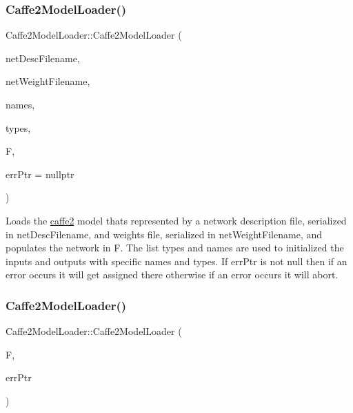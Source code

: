 \subsubsection{\texorpdfstring{Caffe2\+Model\+Loader()}{Caffe2ModelLoader()}\hspace{0.1cm}{\footnotesize\ttfamily [1/2]}}
{\footnotesize\ttfamily Caffe2\+Model\+Loader\+::\+Caffe2\+Model\+Loader (\begin{DoxyParamCaption}\item[{const std\+::string \&}]{net\+Desc\+Filename,  }\item[{const std\+::string \&}]{net\+Weight\+Filename,  }\item[{llvm\+::\+Array\+Ref$<$ const char $\ast$$>$}]{names,  }\item[{llvm\+::\+Array\+Ref$<$ \hyperlink{structglow_1_1_type}{Type\+Ref} $>$}]{types,  }\item[{\hyperlink{classglow_1_1_function}{Function} \&}]{F,  }\item[{\hyperlink{namespaceglow_afdb176c3a672ef66db0ecfc19a8d39bf}{Error} $\ast$}]{err\+Ptr = {\ttfamily nullptr} }\end{DoxyParamCaption})}

Loads the \hyperlink{namespacecaffe2}{caffe2} model that\textquotesingle{}s represented by a network description file, serialized in {\ttfamily net\+Desc\+Filename}, and weights file, serialized in {\ttfamily net\+Weight\+Filename}, and populates the network in {\ttfamily F}. The list {\ttfamily types} and {\ttfamily names} are used to initialized the inputs and outputs with specific names and types. If {\ttfamily err\+Ptr} is not null then if an error occurs it will get assigned there otherwise if an error occurs it will abort. \mbox{\label{classglow_1_1_caffe2_model_loader_a7d346f6d6f2339138d94a001fc344938}} 
\subsubsection{\texorpdfstring{Caffe2\+Model\+Loader()}{Caffe2ModelLoader()}\hspace{0.1cm}{\footnotesize\ttfamily [2/2]}}
{\footnotesize\ttfamily Caffe2\+Model\+Loader\+::\+Caffe2\+Model\+Loader (\begin{DoxyParamCaption}\item[{\hyperlink{classglow_1_1_function}{Function} \&}]{F,  }\item[{\hyperlink{namespaceglow_afdb176c3a672ef66db0ecfc19a8d39bf}{Error} $\ast$}]{err\+Ptr }\end{DoxyParamCaption})}

